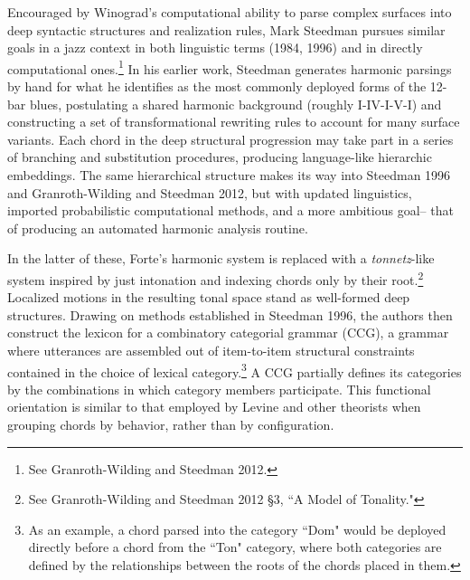 Encouraged by Winograd's computational ability to parse complex surfaces into deep syntactic structures and realization rules, Mark Steedman pursues similar goals in a jazz context in both linguistic terms (1984, 1996) and in directly computational ones.\footnote{See Granroth-Wilding and Steedman 2012.}  In his earlier work, Steedman generates harmonic parsings by hand for what he identifies as the most commonly deployed forms of the 12-bar blues, postulating a shared harmonic background (roughly I-IV-I-V-I) and constructing a set of transformational rewriting rules to account for many surface variants.  Each chord in the deep structural progression may take part in a series of branching and substitution procedures, producing language-like hierarchic embeddings. The same hierarchical structure makes its way into Steedman 1996 and Granroth-Wilding and Steedman 2012, but with updated linguistics, imported probabilistic computational methods, and a more ambitious goal-- that of producing an automated harmonic analysis routine.

In the latter of these, Forte's harmonic system is replaced with a \emph{tonnetz}-like system inspired by just intonation and indexing chords only by their root.\footnote{See Granroth-Wilding and Steedman 2012 \S 3, ``A Model of Tonality."}  Localized motions in the resulting tonal space stand as well-formed deep structures.  Drawing on methods established in Steedman 1996, the authors then construct the lexicon for a combinatory categorial grammar (CCG), a grammar where utterances are assembled out of item-to-item structural constraints contained in the choice of lexical category.\footnote{As an example, a chord parsed into the category ``Dom" would be deployed directly before a chord from the ``Ton" category, where both categories are defined by the relationships between the roots of the chords placed in them.}  A CCG partially defines its categories by the combinations in which category members participate.  This functional orientation is similar to that employed by Levine and other theorists when grouping chords by behavior, rather than by configuration.

